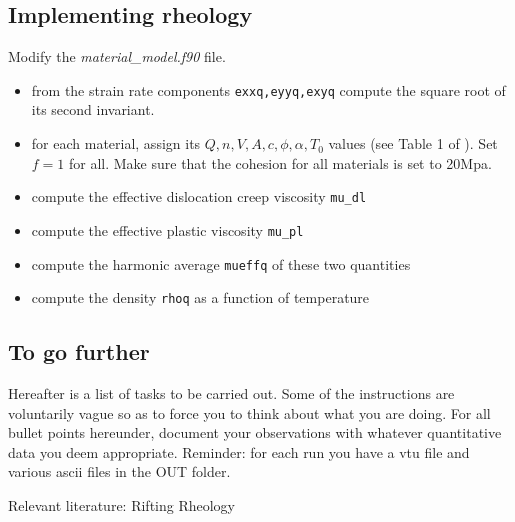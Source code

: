 \subsection*{Implementing rheology}

Modify the {\sl material\_model.f90} file.

\begin{itemize}
\item from the strain rate components {\tt exxq,eyyq,exyq} compute the square root of its second invariant.
\item for each material, assign its $Q,n,V,A,c,\phi,\alpha,T_0$ values (see Table 1 of \cite{nabu15}). Set $f=1$ 
for all. Make sure that the cohesion for all materials is set to 20Mpa.
\item compute the effective dislocation creep viscosity {\tt mu\_dl}
\item compute the effective plastic viscosity {\tt mu\_pl}
\item compute the harmonic average {\tt mueffq} of these two quantities 
\item compute the density {\tt rhoq} as a function of temperature  
\end{itemize}


\subsection*{To go further}

Hereafter is a list of tasks to be carried out. Some of the instructions are voluntarily vague so as to 
force you to think about what you are doing. For all bullet points hereunder, document your observations 
with whatever quantitative data you deem appropriate. Reminder: for each run you have a vtu file 
and various ascii files in the OUT folder. 

Relevant literature: 
Rifting \cite{hube03,hubb05,hube07,hube11,bupb09,alht11,alht12,alhf13,engl83,vacl02} 
Rheology \cite{buro11,budr08,hiko03,kawu93}

